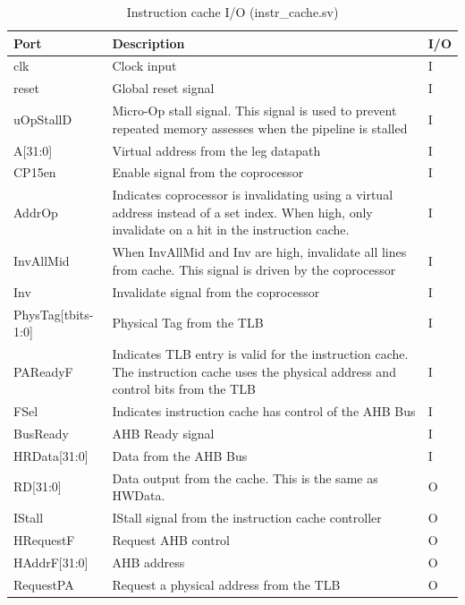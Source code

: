 	\begin{table}
	\label{table:instrio}
	\begin{tabular}{|l|p{85mm}|l|}
	\hline Port & Description & I/O \\ 
	\hline clk & Clock input &  I \\ 
	\hline reset & Global reset signal &  I \\ 
	\hline uOpStallD & Micro-Op stall signal. This signal is used to prevent repeated memory assesses when the pipeline is stalled &  I \\ 
	\hline A[31:0] & Virtual address from the leg datapath & I \\
	\hline CP15en & Enable signal from the coprocessor & I \\
	\hline AddrOp & Indicates coprocessor is invalidating using a virtual address instead of a set index. When high, only invalidate on a hit in the instruction cache.& I \\
	\hline InvAllMid & When InvAllMid and Inv are high, invalidate all lines from cache. This signal is driven by the coprocessor & I \\
	\hline Inv & Invalidate signal from the coprocessor & I \\
	\hline PhysTag[tbits-1:0] & Physical Tag from the TLB & I \\
	\hline PAReadyF & Indicates TLB entry is valid for the instruction cache. The instruction cache uses the physical address and control bits from the TLB & I \\
	\hline FSel & Indicates instruction cache has control of the AHB Bus & I \\
	\hline BusReady & AHB Ready signal & I \\
	\hline HRData[31:0] & Data from the AHB Bus & I \\
	\hline RD[31:0] & Data output from the cache. This is the same as HWData. & O \\
	\hline IStall & IStall signal from the instruction cache controller & O \\
	\hline HRequestF & Request AHB control & O \\
	\hline HAddrF[31:0] & AHB address & O \\
	\hline RequestPA & Request a physical address from the TLB & O \\
	\hline
	\end{tabular} 
	\caption{Instruction cache I/O (instr\_cache.sv)}
	\end{table}

